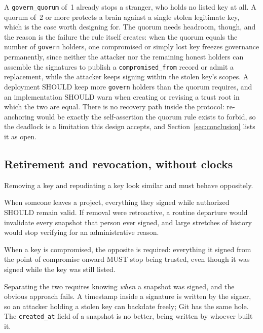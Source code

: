 \documentclass[11pt,a4paper]{article}
\begin{document}
A \texttt{govern\_quorum} of~1 already stops a stranger, who holds no listed
key at all. A quorum of~2 or more protects a brain against a single stolen
legitimate key, which is the case worth designing for. The quorum needs
headroom, though, and the reason is the failure the rule itself creates: when
the quorum equals the number of \texttt{govern} holders, one compromised or
simply lost key freezes governance permanently, since neither the attacker nor
the remaining honest holders can assemble the signatures to publish a
\texttt{compromised\_from} record or admit a replacement, while the attacker
keeps signing within the stolen key's scopes. A deployment SHOULD keep more
\texttt{govern} holders than the quorum requires, and an implementation SHOULD
warn when creating or revising a trust root in which the two are equal. There is no recovery path inside the protocol: re-anchoring would be exactly
the self-assertion the quorum rule exists to forbid, so the deadlock is a
limitation this design accepts, and Section~\ref{sec:conclusion} lists it as
open.

\subsection{Retirement and revocation, without clocks}
\label{sec:revocation}

Removing a key and repudiating a key look similar and must behave oppositely.

When someone leaves a project, everything they signed while authorized SHOULD
remain valid. If removal were retroactive, a routine departure would invalidate
every snapshot that person ever signed, and large stretches of history would
stop verifying for an administrative reason.

When a key is compromised, the opposite is required: everything it signed from
the point of compromise onward MUST stop being trusted, even though it was
signed while the key was still listed.

Separating the two requires knowing \emph{when} a snapshot was signed, and the
obvious approach fails. A timestamp inside a signature is written by the signer,
so an attacker holding a stolen key can backdate freely; Git has the same hole.
The \texttt{created\_at} field of a snapshot is no better, being written by
whoever built it.
\end{document}
